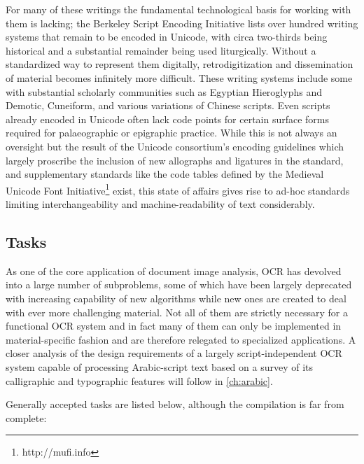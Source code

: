 For many of these writings the fundamental technological basis for working with
them is lacking; the Berkeley Script Encoding Initiative lists over hundred
writing systems that remain to be encoded in Unicode, with circa two-thirds
being historical and a substantial remainder being used liturgically. Without a
standardized way to represent them digitally, retrodigitization and
dissemination of material becomes infinitely more difficult. These writing
systems include some with substantial scholarly communities such as Egyptian
Hieroglyphs and Demotic, Cuneiform, and various variations of Chinese scripts.
Even scripts already encoded in Unicode often lack code points for certain
surface forms required for palaeographic or epigraphic practice. While this is
not always an oversight but the result of the Unicode consortium's encoding
guidelines which largely proscribe the inclusion of new allographs and
ligatures in the standard, and supplementary standards like the code tables
defined by the Medieval Unicode Font Initiative\footnote{http://mufi.info}
exist, this state of affairs gives rise to ad-hoc standards limiting
interchangeability and machine-readability of text considerably.

\subsection{Tasks}

As one of the core application of document image analysis, OCR has devolved
into a large number of subproblems, some of which have been largely deprecated
with increasing capability of new algorithms while new ones are created to deal
with ever more challenging material. Not all of them are strictly necessary for
a functional OCR system and in fact many of them can only be implemented in
material-specific fashion and are therefore relegated to specialized
applications. A closer analysis of the design requirements of a largely
script-independent OCR system capable of processing Arabic-script text based on
a survey of its calligraphic and typographic features will follow in
\ref{ch:arabic}.

Generally accepted tasks are listed below, although the compilation is far from
complete:


